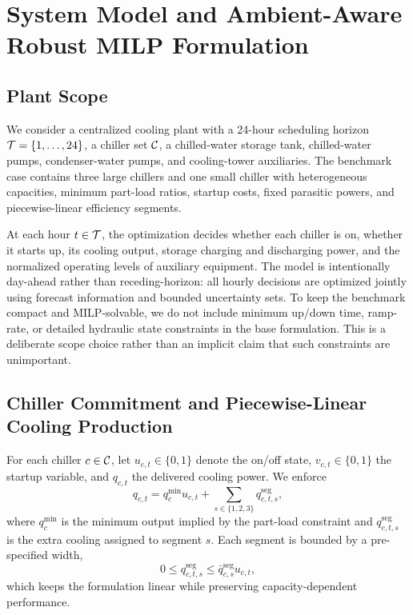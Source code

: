 \section{System Model and Ambient-Aware Robust MILP Formulation}
\label{sec:method}

\subsection{Plant Scope}

We consider a centralized cooling plant with a 24-hour scheduling horizon $\mathcal{T} = \{1,\dots,24\}$, a chiller set $\mathcal{C}$, a chilled-water storage tank, chilled-water pumps, condenser-water pumps, and cooling-tower auxiliaries. The benchmark case contains three large chillers and one small chiller with heterogeneous capacities, minimum part-load ratios, startup costs, fixed parasitic powers, and piecewise-linear efficiency segments.

At each hour $t \in \mathcal{T}$, the optimization decides whether each chiller is on, whether it starts up, its cooling output, storage charging and discharging power, and the normalized operating levels of auxiliary equipment. The model is intentionally day-ahead rather than receding-horizon: all hourly decisions are optimized jointly using forecast information and bounded uncertainty sets. To keep the benchmark compact and MILP-solvable, we do not include minimum up/down time, ramp-rate, or detailed hydraulic state constraints in the base formulation. This is a deliberate scope choice rather than an implicit claim that such constraints are unimportant.

\subsection{Chiller Commitment and Piecewise-Linear Cooling Production}

For each chiller $c \in \mathcal{C}$, let $u_{c,t} \in \{0,1\}$ denote the on/off state, $v_{c,t} \in \{0,1\}$ the startup variable, and $q_{c,t}$ the delivered cooling power. We enforce
\begin{equation}
q_{c,t} = q_{c}^{\min} u_{c,t} + \sum_{s \in \{1,2,3\}} q^{\mathrm{seg}}_{c,t,s},
\end{equation}
where $q_{c}^{\min}$ is the minimum output implied by the part-load constraint and $q^{\mathrm{seg}}_{c,t,s}$ is the extra cooling assigned to segment $s$. Each segment is bounded by a pre-specified width,
\begin{equation}
0 \le q^{\mathrm{seg}}_{c,t,s} \le \bar{q}^{\mathrm{seg}}_{c,s} u_{c,t},
\end{equation}
which keeps the formulation linear while preserving capacity-dependent performance.

